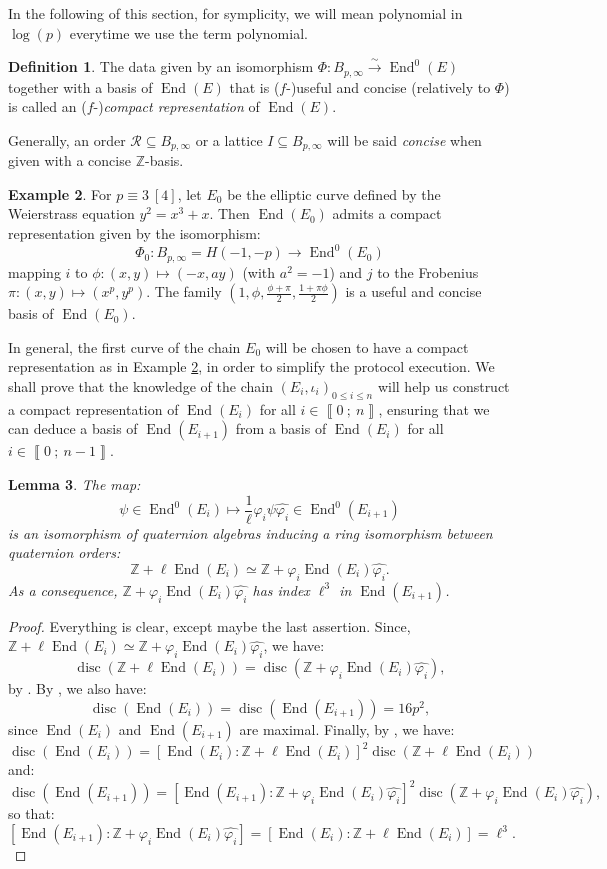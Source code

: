 \documentclass[a4paper,10pt]{report}
\theoremstyle{definition}
\newtheorem{Definition}{Definition}[chapter]
\theoremstyle{plain}
\newtheorem{Lemma}[Definition]{Lemma}
\theoremstyle{definition}
\newtheorem{Example}[Definition]{Example}
\newcommand{\Z}{\mathbb{Z}}
\newcommand{\m}[1]{\mathcal{#1}}
\renewcommand{\i}[2]{\left\llbracket #1~;~#2\right\rrbracket}
\renewcommand{\(}{\left(}
\renewcommand{\)}{\right)}
\DeclareMathOperator{\End}{End}
\DeclareMathOperator{\disc}{disc}
\begin{document}
In the following of this section, for symplicity, we will mean polynomial in $\log(p)$ everytime we use the term polynomial.

\begin{Definition}\label{Definition 3}
The data given by an isomorphism $\Phi : B_{p,\infty} \overset{\sim}{\longrightarrow}\End^0(E)$ together with a basis of $\End(E)$ that is ($f$-)useful and concise (relatively to $\Phi$) is called an ($f$-)\emph{compact representation} of $\End(E)$.

Generally, an order $\m{R}\subseteq B_{p,\infty}$ or a lattice $I\subseteq B_{p,\infty}$ will be said \emph{concise} when given with a concise $\Z$-basis.
\end{Definition}

\begin{Example}\label{Example 2}
For $p\equiv 3 \ [4]$, let $E_0$ be the elliptic curve defined by the Weierstrass equation $y^2=x^3+x$. Then $\End(E_0)$ admits a compact representation given by the isomorphism: 
\[\Phi_0 : B_{p,\infty}=H(-1,-p) \longrightarrow\End^0(E_0)\] 
mapping $i$ to $\phi : (x,y)\longmapsto (-x,ay)$ (with $a^2=-1$) and $j$ to the Frobenius $\pi : (x,y)\longmapsto (x^p,y^p)$. The family $\(1, \phi,\frac{\phi+\pi}{2},\frac{1+\pi\phi}{2}\)$ is a useful and concise basis of $\End(E_0)$.
\end{Example}

In general, the first curve of the chain $E_0$ will be chosen to have a compact representation as in Example \ref{Example 2}, in order to simplify the protocol execution. We shall prove that the knowledge of the chain $(E_i,\iota_i)_{0\leq i\leq n}$ will help us construct a compact representation of $\End(E_i)$ for all $i\in\i{0}{n}$, ensuring that we can deduce a basis of $\End(E_{i+1})$ from a basis of $\End(E_i)$ for all $i\in\i{0}{n-1}$.

\begin{Lemma}\label{Lemma 3}
The map:
\[\psi\in\End^0(E_i)\longmapsto \frac{1}{\ell}\varphi_i\psi\widehat{\varphi_i}\in \End^0(E_{i+1})\]
is an isomorphism of quaternion algebras inducing a ring isomorphism between quaternion orders:
\[\Z+\ell\End(E_i)\simeq \Z+\varphi_i\End(E_i)\widehat{\varphi_i}.\]
As a consequence, $\Z+\varphi_i\End(E_i)\widehat{\varphi_i}$ has index $\ell^3$ in $\End(E_{i+1})$.
\end{Lemma}

\begin{proof}
Everything is clear, except maybe the last assertion.  Since, $\Z+\ell\End(E_i)\simeq \Z+\varphi_i\End(E_i)\widehat{\varphi_i}$, we have:
\[\disc(\Z+\ell\End(E_i))=\disc(\Z+\varphi_i\End(E_i)\widehat{\varphi_i}),\]
by \cite[Corollary 15.2.9]{Voight}. By \cite[Theorem 15.5.5]{Voight}, we also have:
\[\disc(\End(E_i))=\disc(\End(E_{i+1}))=16p^2,\]
since $\End(E_i)$ and $\End(E_{i+1})$ are maximal. Finally, by \cite[Lemma 15.2.15]{Voight}, we have:
\[\disc(\End(E_i))=[\End(E_i):\Z+\ell\End(E_i)]^2\disc(\Z+\ell\End(E_i))\]
and:
\[\disc(\End(E_{i+1}))=[\End(E_{i+1}):\Z+\varphi_i\End(E_i)\widehat{\varphi_i}]^2\disc(\Z+\varphi_i\End(E_i)\widehat{\varphi_i}),\]
so that:
\[[\End(E_{i+1}):\Z+\varphi_i\End(E_i)\widehat{\varphi_i}]=[\End(E_i):\Z+\ell\End(E_i)]=\ell^3.\]
\end{proof}
\end{document}
